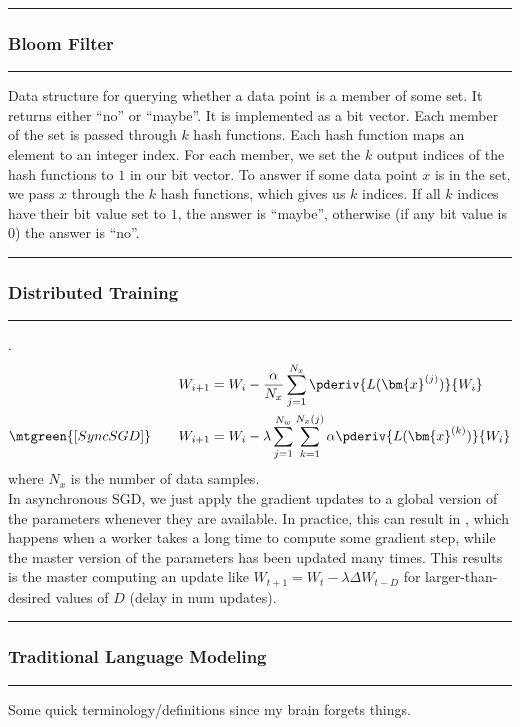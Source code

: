 \documentclass[11pt]{article}
\renewcommand\vec[2][]{\bm{#2}_{#1}}
\newcommand\myspace[1][]{\vspace{#1\bigskipamount}}
\newcommand\p{\Needspace{10\baselineskip} \noindent}
\newcommand\subsub[1]{\Needspace{15\baselineskip}\hrule\subsubsection{#1}\hrule}
\begin{document}
\myspace
\subsub{Bloom Filter}
\myspace

Data structure for querying whether a data point is a member of some set. It returns either ``no'' or ``maybe''. It is implemented as a bit vector. Each member of the set is passed through $k$ hash functions. Each hash function maps an element to an integer index. For each member, we set the $k$ output indices of the hash functions to $1$ in our bit vector. To answer if some data point $x$ is in the set, we pass $x$ through the $k$ hash functions, which gives us $k$ indices. If all $k$ indices have their bit value set to $1$, the answer is ``maybe'', otherwise (if any bit value is 0) the answer is ``no''.



\myspace
\subsub{Distributed Training}
\myspace

\p {}. 
\begin{align}
	W_{i+1}
		&= W_i - \frac{\alpha}{N_x} \sum_{j = 1}^{N_x} \pderiv{L(\vec{x}^{(j)})}{W_i} \\
	\mtgreen{[SyncSGD]} \qquad W_{i + 1} 
		&= W_i - \lambda \sum_{j = 1}^{N_w} \sum_{k = 1}^{N_x(j)} \alpha \pderiv{L(\vec{x}^{(k)})}{W_i} 
\end{align}
where $N_x$ is the number of data samples.   \\

In asynchronous SGD, we just apply the gradient updates to a global version of the parameters whenever they are available. In practice, this can result in , which happens when a worker takes a long time to compute some gradient step, while the master version of the parameters has been updated many times. This results is the master computing an update like $W_{t + 1} = W_t - \lambda \Delta W_{t - D}$ for larger-than-desired values of $D$ (delay in num updates). 



\myspace
\subsub{Traditional Language Modeling}
\myspace

Some quick terminology/definitions since my brain forgets things. 
\end{document}
